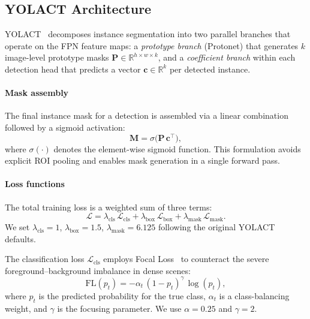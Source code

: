 \documentclass[conference]{IEEEtran}
\begin{document}
\subsection{YOLACT Architecture}
\label{sec:yolact}

YOLACT~\cite{bolya2019yolact} decomposes instance segmentation into two
parallel branches that operate on the FPN feature maps: a
\emph{prototype branch} (Protonet) that generates $k$ image-level
prototype masks $\mathbf{P} \in \mathbb{R}^{h \times w \times k}$, and a
\emph{coefficient branch} within each detection head that predicts a
vector $\mathbf{c} \in \mathbb{R}^{k}$ per detected instance.

\paragraph{Mask assembly}
The final instance mask for a detection is assembled via a linear
combination followed by a sigmoid activation:
\begin{equation}
  \mathbf{M} = \sigma\!\bigl(\mathbf{P}\,\mathbf{c}^{\!\top}\bigr),
  \label{eq:mask}
\end{equation}
where $\sigma(\cdot)$ denotes the element-wise sigmoid function. This
formulation avoids explicit ROI pooling and enables mask generation in a
single forward pass.

\paragraph{Loss functions}
The total training loss is a weighted sum of three terms:
\begin{equation}
  \mathcal{L} = \lambda_{\text{cls}}\,\mathcal{L}_{\text{cls}}
              + \lambda_{\text{box}}\,\mathcal{L}_{\text{box}}
              + \lambda_{\text{mask}}\,\mathcal{L}_{\text{mask}}.
  \label{eq:total_loss}
\end{equation}
We set $\lambda_{\text{cls}} = 1$, $\lambda_{\text{box}} = 1.5$,
$\lambda_{\text{mask}} = 6.125$ following the original YOLACT defaults.

The classification loss $\mathcal{L}_{\text{cls}}$ employs Focal
Loss~\cite{lin2017focal} to counteract the severe foreground--background
imbalance in dense scenes:
\begin{equation}
  \text{FL}(p_t) = -\alpha_t\,(1 - p_t)^{\gamma}\,\log(p_t),
  \label{eq:focal}
\end{equation}
where $p_t$ is the predicted probability for the true class, $\alpha_t$ is
a class-balancing weight, and $\gamma$ is the focusing parameter. We use
$\alpha = 0.25$ and $\gamma = 2$.
\end{document}
